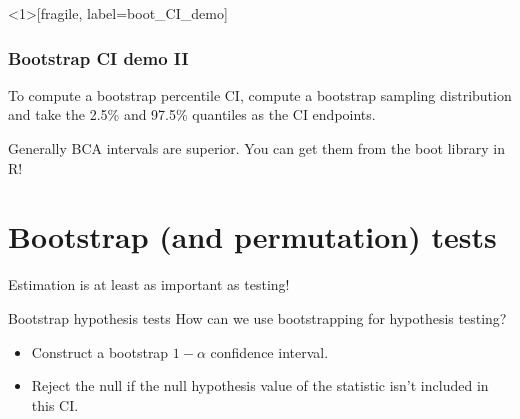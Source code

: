 \documentclass{beamer} %
\begin{document}

\begin{frame}<1>[fragile, label=boot_CI_demo]
\frametitle{Bootstrap CI demo II}
\begin{figure}
\centering
{}
\end{figure}
\end{frame}

\begin{frame}[standout]
To compute a bootstrap percentile CI, compute a bootstrap sampling distribution and take the 2.5\% and 97.5\% quantiles as the CI endpoints.
\end{frame}


\begin{frame}[standout]
Generally BCA intervals are superior. You can get them from the boot library in R!
\end{frame}


\section{Bootstrap (and permutation) tests}

\begin{frame}[standout]
Estimation is at least as important as testing! 
\end{frame}

\begin{frame}{Bootstrap hypothesis tests}
How can we use bootstrapping for hypothesis testing?
\begin{itemize}[<+(1)->]
\item Construct a bootstrap $1-\alpha$ confidence interval.
\item Reject the null if the null hypothesis value of the statistic isn't included in this CI.
\end{itemize}
\end{frame}
\end{document}
